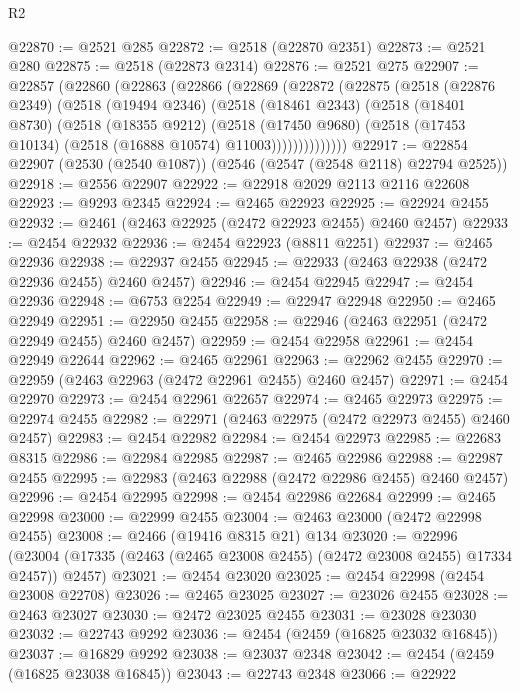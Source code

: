 \begin{lexlean}{R2}
\begin{coremodule}
@22870 := @2521 @285
@22872 := @2518 (@22870 @2351)
@22873 := @2521 @280
@22875 := @2518 (@22873 @2314)
@22876 := @2521 @275
@22907 := @22857
    (@22860
      (@22863
        (@22866
          (@22869
            (@22872
              (@22875
                (@2518
                  (@22876 @2349)
                  (@2518
                    (@19494 @2346)
                    (@2518
                      (@18461 @2343)
                      (@2518
                        (@18401 @8730)
                        (@2518
                          (@18355 @9212)
                          (@2518
                            (@17450 @9680)
                            (@2518 (@17453 @10134) (@2518 (@16888 @10574) @11003))))))))))))))
@22917 := @22854 @22907 (@2530 (@2540 @1087)) (@2546 (@2547 (@2548 @2118) @22794 @2525))
@22918 := @2556 @22907
@22922 := @22918 @2029 @2113 @2116 @22608
@22923 := @9293 @2345
@22924 := @2465 @22923
@22925 := @22924 @2455
@22932 := @2461 (@2463 @22925 (@2472 @22923 @2455) @2460 @2457)
@22933 := @2454 @22932
@22936 := @2454 @22923 (@8811 @2251)
@22937 := @2465 @22936
@22938 := @22937 @2455
@22945 := @22933 (@2463 @22938 (@2472 @22936 @2455) @2460 @2457)
@22946 := @2454 @22945
@22947 := @2454 @22936
@22948 := @6753 @2254
@22949 := @22947 @22948
@22950 := @2465 @22949
@22951 := @22950 @2455
@22958 := @22946 (@2463 @22951 (@2472 @22949 @2455) @2460 @2457)
@22959 := @2454 @22958
@22961 := @2454 @22949 @22644
@22962 := @2465 @22961
@22963 := @22962 @2455
@22970 := @22959 (@2463 @22963 (@2472 @22961 @2455) @2460 @2457)
@22971 := @2454 @22970
@22973 := @2454 @22961 @22657
@22974 := @2465 @22973
@22975 := @22974 @2455
@22982 := @22971 (@2463 @22975 (@2472 @22973 @2455) @2460 @2457)
@22983 := @2454 @22982
@22984 := @2454 @22973
@22985 := @22683 @8315
@22986 := @22984 @22985
@22987 := @2465 @22986
@22988 := @22987 @2455
@22995 := @22983 (@2463 @22988 (@2472 @22986 @2455) @2460 @2457)
@22996 := @2454 @22995
@22998 := @2454 @22986 @22684
@22999 := @2465 @22998
@23000 := @22999 @2455
@23004 := @2463 @23000 (@2472 @22998 @2455)
@23008 := @2466 (@19416 @8315 @21) @134
@23020 := @22996
    (@23004 (@17335 (@2463 (@2465 @23008 @2455) (@2472 @23008 @2455) @17334 @2457)) @2457)
@23021 := @2454 @23020
@23025 := @2454 @22998 (@2454 @23008 @22708)
@23026 := @2465 @23025
@23027 := @23026 @2455
@23028 := @2463 @23027
@23030 := @2472 @23025 @2455
@23031 := @23028 @23030
@23032 := @22743 @9292
@23036 := @2454 (@2459 (@16825 @23032 @16845))
@23037 := @16829 @9292
@23038 := @23037 @2348
@23042 := @2454 (@2459 (@16825 @23038 @16845))
@23043 := @22743 @2348
@23066 := @22922

\end{coremodule}
\end{lexlean}
